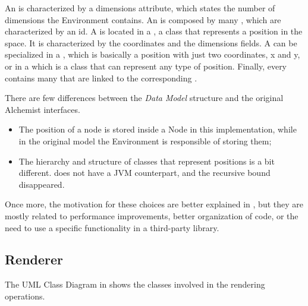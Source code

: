 An  is characterized by a dimensions attribute, which states the number of dimensions the Environment contains. An  is composed by many , which are characterized by an id. A  is located in a , a class that represents a position in the space. It is characterized by the coordinates and the dimensions fields. A  can be specialized in a , which is basically a position with just two coordinates, x and y, or in a  which is a class that can represent any type of position.
Finally, every  contains many  that are linked to the corresponding .\newline

There are few differences between the \textit{Data Model }structure and the original Alchemist interfaces.
\begin{itemize}
	\item The position of a node is stored inside a Node in this implementation, while in the original model the Environment is responsible of storing them;
	\item The hierarchy and structure of classes that represent positions is a bit different.  does not have a JVM counterpart, and the recursive bound disappeared.
\end{itemize}
Once more, the motivation for these choices are better explained in , but they are mostly related to performance improvements, better organization of code, or the need to use a specific functionality in a third-party library.
\subsection{Renderer}
\label{ssec:renderer}

The UML Class Diagram in  shows the classes involved in the rendering operations.\newline


